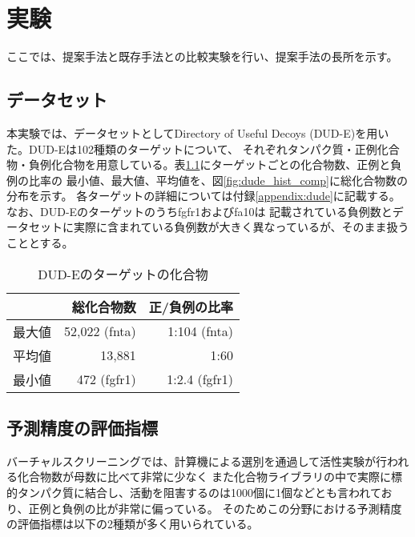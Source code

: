\chapter{実験}
ここでは、提案手法と既存手法との比較実験を行い、提案手法の長所を示す。


\section{データセット}
本実験では、データセットとしてDirectory of Useful Decoys (DUD-E)\cite{Mysinger2012}を用いた。DUD-Eは102種類のターゲットについて、
それぞれタンパク質・正例化合物・負例化合物を用意している。表\ref{table:dude}にターゲットごとの化合物数、正例と負例の比率の
最小値、最大値、平均値を、図\ref{fig:dude_hist_comp}に総化合物数の分布を示す。
各ターゲットの詳細については付録\ref{appendix:dude}に記載する。なお、DUD-Eのターゲットのうちfgfr1およびfa10は
記載されている負例数とデータセットに実際に含まれている負例数が大きく異なっているが、そのまま扱うこととする。

\begin{table}[htb] \centering
	\caption{DUD-Eのターゲットの化合物}
	\label {table:dude}
	\begin{tabular}{c|rr|}
			&総化合物数		&正/負例の比率	\\ \hline
	最大値	&52,022 (fnta)		&1:104 (fnta)		\\
	平均値	&13,881			&1:60			\\
	最小値	&472 (fgfr1)		&1:2.4 (fgfr1)		\\ \hline
	\end{tabular}
\end{table}

	
\section{予測精度の評価指標}
バーチャルスクリーニングでは、計算機による選別を通過して活性実験が行われる化合物数が母数に比べて非常に少なく
また化合物ライブラリの中で実際に標的タンパク質に結合し、活動を阻害するのは1000個に1個などとも言われており、正例と負例の比が非常に偏っている。
そのためこの分野における予測精度の評価指標は以下の2種類が多く用いられている。

